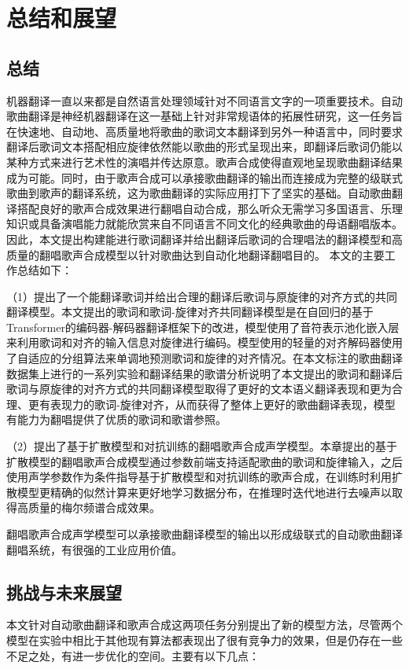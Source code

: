 



% 
\chapter{总结和展望}
\section{总结}
机器翻译一直以来都是自然语言处理领域针对不同语言文字的一项重要技术。自动歌曲翻译是神经机器翻译在这一基础上针对非常规语体的拓展性研究，这一任务旨在快速地、自动地、高质量地将歌曲的歌词文本翻译到另外一种语言中，同时要求翻译后歌词文本搭配相应旋律依然能以歌曲的形式呈现出来，即翻译后歌词仍能以某种方式来进行艺术性的演唱并传达原意。歌声合成使得直观地呈现歌曲翻译结果成为可能。同时，由于歌声合成可以承接歌曲翻译的输出而连接成为完整的级联式歌曲到歌声的翻译系统，这为歌曲翻译的实际应用打下了坚实的基础。自动歌曲翻译搭配良好的歌声合成效果进行翻唱自动合成，那么听众无需学习多国语言、乐理知识或具备演唱能力就能欣赏来自不同语言不同文化的经典歌曲的母语翻唱版本。
因此，本文提出构建能进行歌词翻译并给出翻译后歌词的合理唱法的翻译模型和高质量的翻唱歌声合成模型以针对歌曲达到自动化地翻译翻唱目的。
本文的主要工作总结如下：

（1）提出了一个能翻译歌词并给出合理的翻译后歌词与原旋律的对齐方式的共同翻译模型。本文提出的歌词和歌词-旋律对齐共同翻译模型是在自回归的基于Transformer的编码器-解码器翻译框架下的改进，模型使用了音符表示池化嵌入层来利用歌词和对齐的输入信息对旋律进行编码。模型使用的轻量的对齐解码器使用了自适应的分组算法来单调地预测歌词和旋律的对齐情况。在本文标注的歌曲翻译数据集上进行的一系列实验和翻译结果的歌谱分析说明了本文提出的歌词和翻译后歌词与原旋律的对齐方式的共同翻译模型取得了更好的文本语义翻译表现和更为合理、更有表现力的歌词-旋律对齐，从而获得了整体上更好的歌曲翻译表现，模型有能力为翻唱提供了优质的歌词和歌谱参照。

（2）提出了基于扩散模型和对抗训练的翻唱歌声合成声学模型。本章提出的基于扩散模型的翻唱歌声合成模型通过参数前端支持适配歌曲的歌词和旋律输入，之后使用声学参数作为条件指导基于扩散模型和对抗训练的歌声合成，在训练时利用扩散模型更精确的似然计算来更好地学习数据分布，在推理时迭代地进行去噪声以取得高质量的梅尔频谱合成效果。

翻唱歌声合成声学模型可以承接歌曲翻译模型的输出以形成级联式的自动歌曲翻译翻唱系统，有很强的工业应用价值。
\section{挑战与未来展望}
本文针对自动歌曲翻译和歌声合成这两项任务分别提出了新的模型方法，尽管两个模型在实验中相比于其他现有算法都表现出了很有竞争力的效果，但是仍存在一些不足之处，有进一步优化的空间。主要有以下几点：

